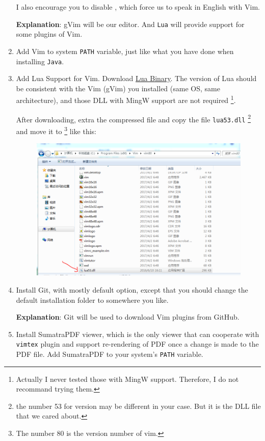 \documentclass{article}
\begin{document}
\begin{enumerate}
        I also encourage you to disable , which force us to speak in English with Vim.

        \textbf{Explanation}: gVim will be our editor. And
        \texttt{Lua} will provide support for some plugins of Vim.

    \item Add Vim to system \texttt{PATH} variable, just like what you
        have done when installing \texttt{Java}.
    \item Add Lua Support for Vim. Download
        \href{http://luabinaries.sourceforge.net/download.html}{Lua
        Binary}. The version of Lua should be consistent with the Vim
        (gVim) you installed (same OS, same architecture), and those
        DLL with MingW support are not required
        \footnote{Actually I never tested those with MingW support.
        Therefore, I do not recommand trying them.}.

        After downloading, extra the compressed file and copy the file
        \texttt{lua53.dll} \footnote{the number 53 for version may be different
        in your case. But it is the DLL file that we cared about.} and
        move it to 
        \footnote{The number $80$ is the version number of vim.} like
        this:
        \begin{figure}[H]
            \centering
            \includegraphics[width=0.6\linewidth]{pics/8.PNG}
        \end{figure}

    \item Install Git, with mostly default option, except that you
        should change the default installation folder to somewhere you
        like.

        \textbf{Explanation}: Git will be used to download Vim plugins
        from GitHub.

    \item Install SumatraPDF viewer, which is the only viewer that can
        cooperate with \texttt{vimtex} plugin and support re-rendering
        of PDF once a change is made to the PDF file. Add SumatraPDF
        to your system's \texttt{PATH} variable.


\end{enumerate}
\end{document}
